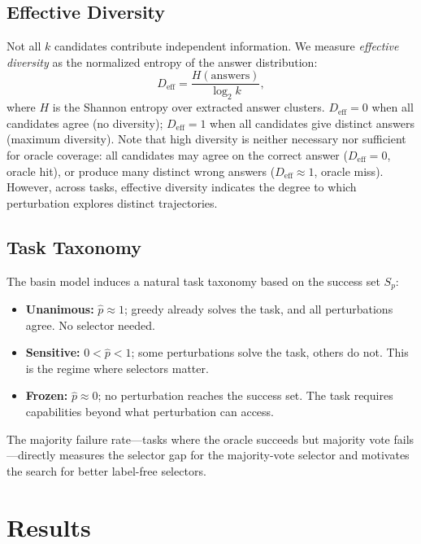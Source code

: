 \documentclass{article}
\begin{document}
\subsection{Effective Diversity}

Not all $k$ candidates contribute independent information. We measure
\emph{effective diversity} as the normalized entropy of the answer
distribution:
\[
D_{\text{eff}} = \frac{H(\text{answers})}{\log_2 k},
\]
where $H$ is the Shannon entropy over extracted answer clusters.
$D_{\text{eff}} = 0$ when all candidates agree (no diversity);
$D_{\text{eff}} = 1$ when all candidates give distinct answers
(maximum diversity). Note that high diversity is neither necessary
nor sufficient for oracle coverage: all candidates may agree on
the correct answer ($D_{\text{eff}} = 0$, oracle hit), or produce
many distinct wrong answers ($D_{\text{eff}} \approx 1$, oracle miss).
However, across tasks, effective diversity indicates the degree to
which perturbation explores distinct trajectories.

\subsection{Task Taxonomy}

The basin model induces a natural task taxonomy based on the success
set $S_p$:
\begin{itemize}
    \item \textbf{Unanimous:} $\hat{p} \approx 1$; greedy already solves the task, and all perturbations agree. No selector needed.
    \item \textbf{Sensitive:} $0 < \hat{p} < 1$; some perturbations solve the task, others do not. This is the regime where selectors matter.
    \item \textbf{Frozen:} $\hat{p} \approx 0$; no perturbation reaches the success set. The task requires capabilities beyond what perturbation can access.
\end{itemize}

The majority failure rate---tasks where the oracle succeeds but
majority vote fails---directly measures the selector gap for the
majority-vote selector and motivates the search for better
label-free selectors.

\section{Results} %
\end{document}
